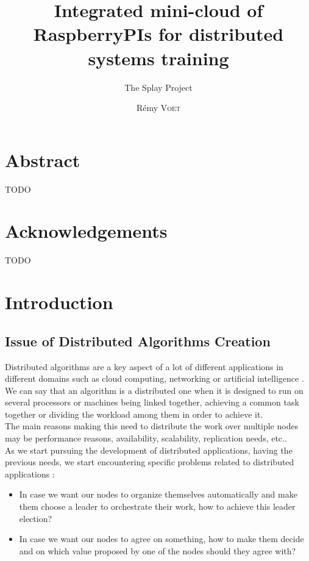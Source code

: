 \documentclass{eplmastersthesis}
\title{Integrated mini-cloud of RaspberryPIs for distributed systems training}
\subtitle{The Splay Project}
\author{Rémy \textsc{Voet}}
\begin{document}
  \maketitle

  \chapter*{Abstract}
  {\color{red} TODO}

  \chapter*{Acknowledgements}
  {\color{red} TODO}

  \tableofcontents

  \chapter{Introduction}


    \section{Issue of Distributed Algorithms Creation}

      Distributed algorithms are a key aspect of a lot of different
      applications in different domains such as cloud computing, networking
      or artificial intelligence \cite{DistributedArtificialIntelligence}.\\
      We can say that an algorithm is a distributed one when it is designed to
      run on several processors or machines being linked together, achieving
      a common task together or dividing the workload among them in order to
      achieve it.\\
      The main reasons making this need to distribute the work over multiple
      nodes may be performance reasons, availability, scalability, replication
      needs, etc..\\
      As we start pursuing the development of distributed applications, having
      the previous needs, we start encountering specific problems related to
      distributed applications :
      \begin{itemize}
        \item In case we want our nodes to organize themselves automatically and
        make them choose a leader to orchestrate their work, how to achieve
        this leader election?
        \item In case we want our nodes to agree on something, how to make
        them decide and on which value proposed by one of the nodes should they
        agree with?
      \end{itemize}
\end{document}

